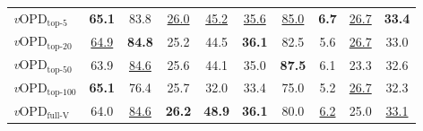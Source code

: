 \documentclass{article}
\newcommand{\method}{\emph{v}OPD}
\begin{document}
\begin{table}[!h]
{\begin{tabular}{l|cc|cc|cc|cc|c}
\method{}$_{\text{top-}5}$ 
& \textbf{65.1} & 83.8 & \underline{26.0} & \underline{45.2} & \underline{35.6} & \underline{85.0} & \textbf{6.7} & \underline{26.7} & \textbf{33.4} \\
\method{}$_{\text{top-}20}$ 
& \underline{64.9} & \textbf{84.8} & 25.2 & 44.5 & \textbf{36.1} & 82.5 & 5.6 & \underline{26.7} & 33.0 \\
\method{}$_{\text{top-}50}$ 
& 63.9 & \underline{84.6} & 25.6 & 44.1 & 35.0 & \textbf{87.5} & 6.1 & 23.3 & 32.6 \\
\method{}$_{\text{top-}100}$ 
& \textbf{65.1} & 76.4 & 25.7 & 32.0 & 33.4 & 75.0 & 5.2 & \underline{26.7} & 32.3 \\
\method{}$_{\text{full-V}}$ 
& 64.0 & \underline{84.6} & \textbf{26.2} & \textbf{48.9} & \textbf{36.1} & 80.0 & \underline{6.2} & 25.0 & \underline{33.1} \\
\bottomrule
\end{tabular}%
}
\end{table}
\end{document}

